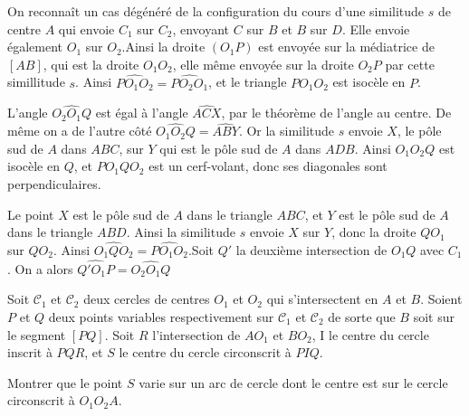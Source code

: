 \begin{sol}
On reconnaît un cas dégénéré de la configuration du cours d'une similitude $s$ de centre $A$ qui envoie $C_1$ sur $C_2$, envoyant $C$ sur $B$ et $B$ sur $D$. Elle envoie également $O_1$ sur $O_2$.Ainsi la droite $(O_1P)$ est envoyée sur la médiatrice de $[AB]$, qui est la droite $O_1O_2$, elle même envoyée sur la droite $O_2P$ par cette simillitude $s$. Ainsi $\widehat{PO_1O_2} = \widehat{PO_2O_1}$, et le triangle $PO_1O_2$ est isocèle en $P$.

\medskip

L'angle $\widehat{O_2O_1Q}$ est égal à l'angle $\widehat{ACX}$, par le théorème de l'angle au centre. De même on a de l'autre côté $\widehat{O_1O_2Q} = \widehat{ABY}$. Or la similitude $s$ envoie $X$, le pôle sud de $A$ dans $ABC$, sur $Y$ qui est le pôle sud de $A$ dans $ADB$. Ainsi $O_1O_2Q$ est isocèle en $Q$, et $PO_1QO_2$ est un cerf-volant, donc ses diagonales sont perpendiculaires.

\medskip

Le point $X$ est le pôle sud de $A$ dans le triangle $ABC$, et $Y$ est le pôle sud de $A$ dans le triangle $ABD$. Ainsi la similitude $s$ envoie $X$ sur $Y$, donc la droite $QO_1$ sur $QO_2$. Ainsi $\widehat{O_1QO_2} = \widehat{PO_1O_2}$.Soit $Q'$ la deuxième intersection de $O_1Q$ avec $C_1$. On a alors $\widehat{Q'O_1P} = \widehat{O_2O_1Q}$

\end{sol}

\begin{exo}
Soit $\mathcal{C}_1$ et $\mathcal{C}_2$ deux cercles de centres $O_1$ et $O_2$ qui s'intersectent en $A$ et $B$. Soient $P$ et $Q$ deux points variables respectivement sur $\mathcal{C}_1$ et $\mathcal{C}_2$ de sorte que $B$ soit sur le segment $[PQ]$. Soit $R$ l'intersection de $AO_1$ et $BO_2$, I le centre du cercle inscrit à $PQR$, et $S$ le centre du cercle circonscrit à $PIQ$.

Montrer que le point $S$ varie sur un arc de cercle dont le centre est sur le cercle circonscrit à $O_1O_2A$.
\end{exo}

